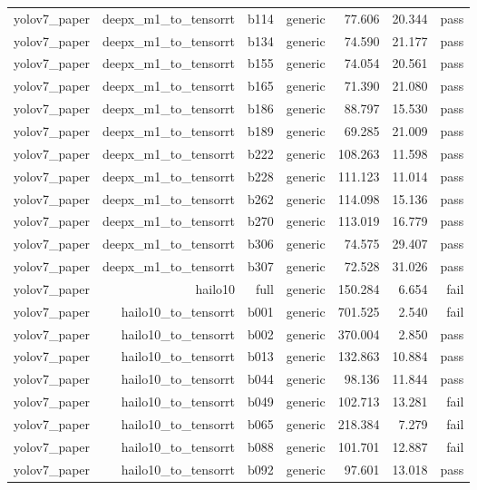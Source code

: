 \begin{table}[t]
\begin{tabular}{lrrrrrr}
yolov7\_paper & deepx\_m1\_to\_tensorrt & b114 & generic & 77.606 & 20.344 & pass \\
yolov7\_paper & deepx\_m1\_to\_tensorrt & b134 & generic & 74.590 & 21.177 & pass \\
yolov7\_paper & deepx\_m1\_to\_tensorrt & b155 & generic & 74.054 & 20.561 & pass \\
yolov7\_paper & deepx\_m1\_to\_tensorrt & b165 & generic & 71.390 & 21.080 & pass \\
yolov7\_paper & deepx\_m1\_to\_tensorrt & b186 & generic & 88.797 & 15.530 & pass \\
yolov7\_paper & deepx\_m1\_to\_tensorrt & b189 & generic & 69.285 & 21.009 & pass \\
yolov7\_paper & deepx\_m1\_to\_tensorrt & b222 & generic & 108.263 & 11.598 & pass \\
yolov7\_paper & deepx\_m1\_to\_tensorrt & b228 & generic & 111.123 & 11.014 & pass \\
yolov7\_paper & deepx\_m1\_to\_tensorrt & b262 & generic & 114.098 & 15.136 & pass \\
yolov7\_paper & deepx\_m1\_to\_tensorrt & b270 & generic & 113.019 & 16.779 & pass \\
yolov7\_paper & deepx\_m1\_to\_tensorrt & b306 & generic & 74.575 & 29.407 & pass \\
yolov7\_paper & deepx\_m1\_to\_tensorrt & b307 & generic & 72.528 & 31.026 & pass \\
yolov7\_paper & hailo10 & full & generic & 150.284 & 6.654 & fail \\
yolov7\_paper & hailo10\_to\_tensorrt & b001 & generic & 701.525 & 2.540 & fail \\
yolov7\_paper & hailo10\_to\_tensorrt & b002 & generic & 370.004 & 2.850 & pass \\
yolov7\_paper & hailo10\_to\_tensorrt & b013 & generic & 132.863 & 10.884 & pass \\
yolov7\_paper & hailo10\_to\_tensorrt & b044 & generic & 98.136 & 11.844 & pass \\
yolov7\_paper & hailo10\_to\_tensorrt & b049 & generic & 102.713 & 13.281 & fail \\
yolov7\_paper & hailo10\_to\_tensorrt & b065 & generic & 218.384 & 7.279 & fail \\
yolov7\_paper & hailo10\_to\_tensorrt & b088 & generic & 101.701 & 12.887 & fail \\
yolov7\_paper & hailo10\_to\_tensorrt & b092 & generic & 97.601 & 13.018 & pass \\

\end{tabular}
\end{table}
